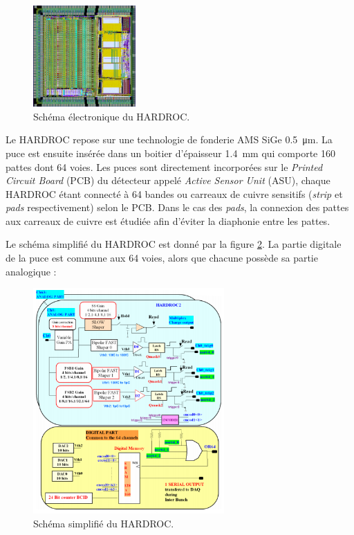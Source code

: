\begin{figure}[ht!]
	\centering
	\includegraphics[width=0.35\textwidth]{GLA/HARDROC.png}
	\captionsetup{type=figure}\caption{Schéma électronique du HARDROC.}
	\label{hardroc}
\end{figure}

Le HARDROC repose sur une technologie de fonderie AMS SiGe \SI{0.5}{\micro\meter}. La puce est ensuite insérée dans un boitier d'épaisseur \SI{1.4}{\milli\meter} qui comporte \num{160} pattes dont \num{64} voies. Les puces sont directement incorporées sur le \textit{Printed Circuit Board} (PCB) du détecteur appelé \textit{Active Sensor Unit} (ASU), chaque HARDROC étant connecté à \num{64} bandes ou carreaux de cuivre sensitifs (\textit{strip} et \textit{pads} respectivement) selon le PCB. Dans le cas des \textit{pads}, la connexion des pattes aux carreaux de cuivre est étudiée afin d'éviter la diaphonie entre les pattes.

Le schéma simplifié du HARDROC est donné par la figure \ref{scheme}. La partie digitale de la puce est commune aux \num{64} voies, alors que chacune possède sa partie analogique :

\begin{figure}[ht!]
	\centering
	\includegraphics[width=0.65\textwidth]{GLA/scheme.png}
	\captionsetup{type=figure}\caption{Schéma simplifié du HARDROC.}
	\label{scheme}
\end{figure}


